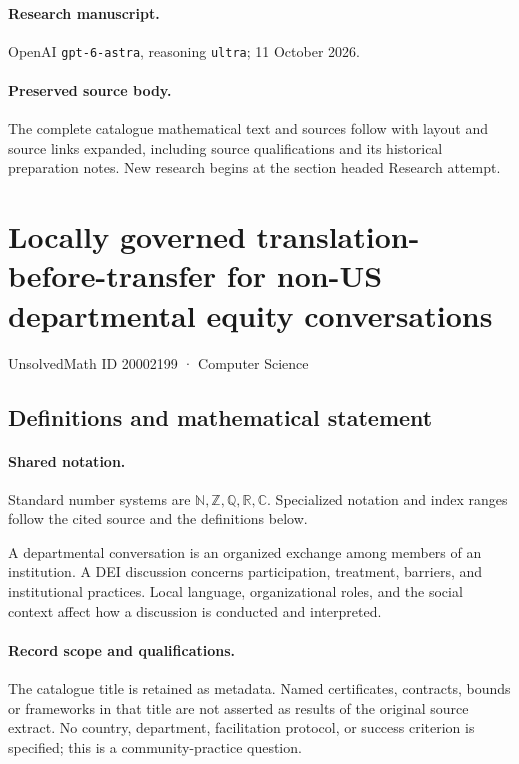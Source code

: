 \documentclass[11pt]{article}
\begin{document}
\paragraph{Research manuscript.} OpenAI \texttt{gpt-6-astra}, reasoning \texttt{ultra}; 11 October 2026.
\paragraph{Preserved source body.} The complete catalogue mathematical text and sources follow with layout and source links expanded, including source qualifications and its historical preparation notes. New research begins at the section headed Research attempt.

\section{Locally governed translation-before-transfer for non-US departmental equity conversations}\label{20002199}
{\small UnsolvedMath ID 20002199 · Computer Science}
\subsection{Definitions and mathematical statement}

\paragraph{Shared notation.}Standard number systems are $\mathbb N,\mathbb Z,\mathbb Q,\mathbb R,\mathbb C$. Specialized notation and index ranges follow the cited source and the definitions below.


A departmental conversation is an organized exchange among members of an institution. A DEI discussion concerns participation, treatment, barriers, and institutional practices. Local language, organizational roles, and the social context affect how a discussion is conducted and interpreted.
\paragraph{Record scope and qualifications.}
The catalogue title is retained as metadata. Named certificates, contracts, bounds or frameworks in that title are not asserted as results of the original source extract.
No country, department, facilitation protocol, or success criterion is specified; this is a community-practice question.
\end{document}
